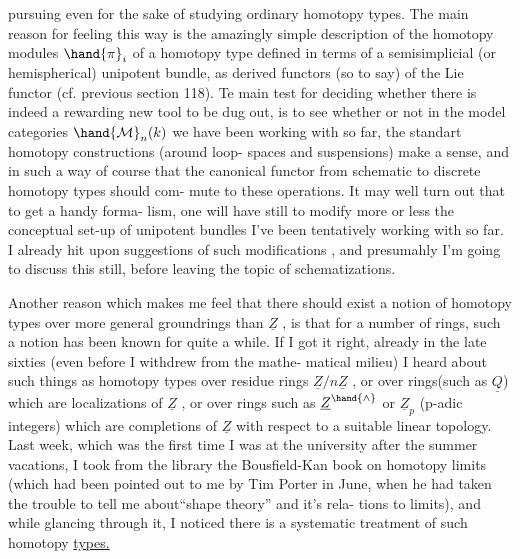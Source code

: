 
pursuing even for the  sake of studying ordinary homotopy types.  The main
reason for feeling this way is the amazingly simple description of the
homotopy modules $\hand{\pi}_{i}$ of a homotopy type defined in terms of a semisimplicial
(or hemispherical) unipotent bundle,   as derived functors 
(so to say) of the Lie functor (cf. previous section 118).  Te main test
for deciding whether there is indeed a rewarding new tool to be dug out,
is to see whether or not in the model categories  $\hand{\mathcal{M}}_{n}(k)$ we have been
working with so far,   the standart homotopy constructions (around loop-%
spaces and suspensions) make a sense,  and in such a way of course that
the canonical functor from schematic to discrete homotopy types should com-%
mute to these operations.  It may well turn out that to get a handy forma-%
lism,  one will have still to modify more or less the conceptual set-up
of unipotent bundles I've been tentatively working with so far.  I already
 hit upon suggestions of such modifications , and presumahly  I'm
going to discuss this still,  before leaving the topic of schematizations.

Another reason which makes me feel that there should exist a notion of
homotopy types over more general groundrings  than $\underline{Z}$ ,  is that for a number
of rings,  such a notion has been known for quite a while.  If I got it 
right,  already in the late sixties (even before I withdrew from the mathe-%
matical milieu) I heard about such things as homotopy types over residue
 rings $\underline{Z}/n\underline{Z}$ ,  or over rings(such as $\underline{Q}$) which are localizations of $\underline{Z}$ ,  or
over rings such as $\underline{Z}^{\hand{\wedge}}$  or $\underline{Z}_{p}$ (p-adic integers)  which are completions
of $\underline{Z}$ with respect to a suitable   linear topology.  Last
week,  which was the first time I was at the university  after the
summer vacations,  I took from the library the Bousfield-Kan  book on
homotopy limits (which had been pointed out to me by Tim Porter in June,
when he had taken the trouble to tell me about``shape theory'' and it's rela-%
tions to   limits), and while glancing through it,  I noticed there
 is a systematic treatment of such homotopy \uline{types.}\hand{$\rfloor\!\ulcorner$}

